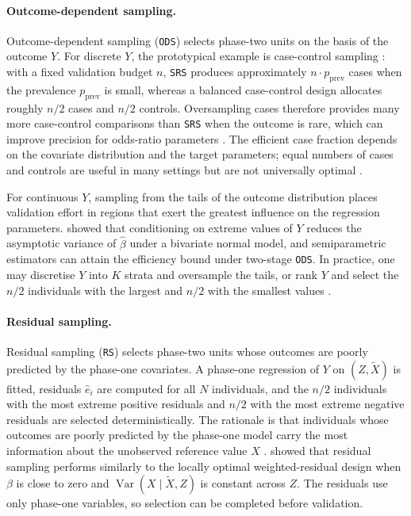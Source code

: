 \paragraph{Outcome-dependent sampling.}
Outcome-dependent sampling (\texttt{ODS}) selects phase-two units on the basis of the outcome $Y$. For discrete $Y$, the prototypical example is case-control sampling \citep{breslow1988logistic}: with a fixed validation budget $n$, \texttt{SRS} produces approximately $n \cdot p_{\mathrm{prev}}$ cases when the prevalence $p_{\mathrm{prev}}$ is small, whereas a balanced case-control design allocates roughly $n/2$ cases and $n/2$ controls. Oversampling cases therefore provides many more case-control comparisons than \texttt{SRS} when the outcome is rare, which can improve precision for odds-ratio parameters \citep{prentice1979logistic}. The efficient case fraction depends on the covariate distribution and the target parameters; equal numbers of cases and controls are useful in many settings but are not universally optimal \citep{cain1988twoStage}.

For continuous $Y$, sampling from the tails of the outcome distribution places validation effort in regions that exert the greatest influence on the regression parameters. \citet{zhou2002semiparametric} showed that conditioning on extreme values of $Y$ reduces the asymptotic variance of $\hat{\beta}$ under a bivariate normal model, and semiparametric estimators can attain the efficiency bound under two-stage \texttt{ODS}. In practice, one may discretise $Y$ into $K$ strata and oversample the tails, or rank $Y$ and select the $n/2$ individuals with the largest and $n/2$ with the smallest values \citep{zhou2002semiparametric, song2009twostage}.

\paragraph{Residual sampling.}
Residual sampling (\texttt{RS}) selects phase-two units whose outcomes are poorly predicted by the phase-one covariates. A phase-one regression of $Y$ on $(Z, \tilde{X})$ is fitted, residuals $\hat{e}_i$ are computed for all $N$ individuals, and the $n/2$ individuals with the most extreme positive residuals and $n/2$ with the most extreme negative residuals are selected deterministically. The rationale is that individuals whose outcomes are poorly predicted by the phase-one model carry the most information about the unobserved reference value $X$ \citep{breslow2009improved}. \citet{amorim2021two} showed that residual sampling performs similarly to the locally optimal weighted-residual design when $\beta$ is close to zero and $\operatorname{Var}(X\mid\tilde{X},Z)$ is constant across $Z$. The residuals use only phase-one variables, so selection can be completed before validation.

